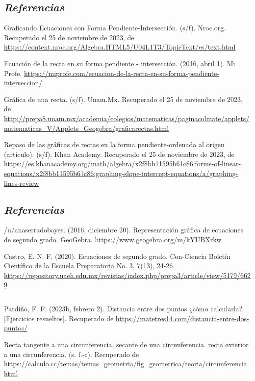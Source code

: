 \documentclass{IEEEcsmag}
\begin{document}
\begin{thebibliography}{1}
\subsection{\textbf{\textit{Referencias}}}
 \item Graficando Ecuaciones con Forma Pendiente-Intersección. (s/f). Nroc.org. Recuperado el 25 de noviembre de 2023, de \url{https://content.nroc.org/Algebra.HTML5/U04L1T3/TopicText/es/text.html}\\
 \item Ecuación de la recta en su forma pendiente - intersección. (2016, abril 1). Mi Profe. \url{https://miprofe.com/ecuacion-de-la-recta-en-su-forma-pendiente-interseccion/} 
 \item Gráfica de una recta. (s/f). Unam.Mx. Recuperado el 25 de noviembre de 2023, de \url{http://prepa8.unam.mx/academia/colegios/matematicas/paginacolmate/applets/matematicas_V/Applets_Geogebra/graficarectas.html}
\item Repaso de las gráficas de rectas en la forma pendiente-ordenada al origen (artículo). (s/f). Khan Academy. Recuperado el 25 de noviembre de 2023, de \url{https://es.khanacademy.org/math/algebra/x2f8bb11595b61c86:forms-of-linear-equations/x2f8bb11595b61c86:graphing-slope-intercept-equations/a/graphing-lines-review}
\subsection{}

\subsection{\textbf{\textit{Referencias}}} 
\item 
/u/anaserradobayes. (2016, diciembre 20). Representación gráfica de ecuaciones de segundo grado. GeoGebra. 
\url{https://www.geogebra.org/m/kYUBXrkw}\\
\item 
Castro, E. N. F. (2020). Ecuaciones de segundo grado. Con-Ciencia Boletín Científico de la Escuela Preparatoria No. 3, 7(13), 24-26.
\url{https://repository.uaeh.edu.mx/revistas/index.php/prepa3/article/view/5179/6629}
\item 
\subsection{}
\item Pardiño, F. F. (2023b, febrero 2). Distancia entre dos puntos ¿cómo calcularla? [Ejercicios resueltos]. Recuperado de
 \url{https://matetres14.com/distancia-entre-dos-puntos/}\\
\item Recta tangente a una circunferencia. secante de una circunferencia. recta exterior a una circunferencia. (s. f.-c). Recuperado de
\url{https://calculo.cc/temas/temas_geometria/fig_geometrica/teoria/circunferencia.html}

\end{thebibliography}
\end{document}
